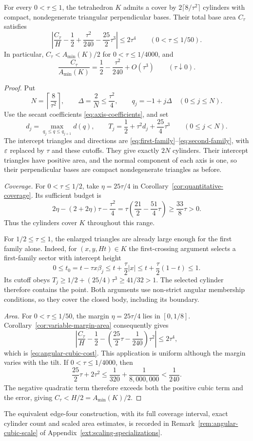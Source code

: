 \begin{proposition}\label{prop:angular-cubic}
For every $0<\tau\le1$, the tetrahedron $K$ admits a cover by
$2\lceil8/\tau^2\rceil$ cylinders with compact, nondegenerate triangular
perpendicular bases. Their total base area $C_\tau$ satisfies
\begin{equation}\label{eq:angular-cubic-cost}
 \left|\frac{C_\tau}{H}-\frac12+\frac{\tau^2}{240}
                   -\frac{25}{2}\tau^3\right|
 \le2\tau^4\qquad(0<\tau\le1/50).
\end{equation}
In particular, $C_\tau<A_{\min}(K)/2$ for $0<\tau\le1/4000$, and
\[
 \frac{C_\tau}{A_{\min}(K)}
 =\frac12-\frac{\tau^2}{240}+O(\tau^3)
 \qquad(\tau\downarrow0).
\]
\end{proposition}
\begin{proof}
Put
\[
 N=\left\lceil\frac8{\tau^2}\right\rceil,\qquad
 \Delta=\frac2N\le\frac{\tau^2}{4},\qquad
 q_j=-1+j\Delta\quad(0\le j\le N).
\]
Use the secant coefficients \eqref{eq:axis-coefficients}, and set
\begin{equation}\label{eq:cubic-caps}
 d_j=\max_{q_j\le q\le q_{j+1}}d(q),\qquad
 T_j=\frac12+\tau^2d_j+\frac{25}{4}\tau^3
 \qquad(0\le j<N).
\end{equation}
The intercept triangles and directions are
\eqref{eq:first-family}--\eqref{eq:second-family}, with $\varepsilon$ replaced
by $\tau$ and these cutoffs. They give exactly $2N$ cylinders.
Their intercept triangles have positive area, and the normal component
of each axis is one, so their perpendicular bases are compact
nondegenerate triangles as before.

\emph{Coverage.} For $0<\tau\le1/2$, take $\eta=25\tau/4$ in
Corollary~\ref{cor:quantitative-coverage}. Its sufficient budget is
\[
 2\eta-(2+2\eta)\tau-\frac{\tau^2}{4}
 =\tau\left(\frac{21}{2}-\frac{51}{4}\tau\right)
 \ge\frac{33}{8}\tau>0.
\]
Thus the cylinders cover $K$ throughout this range.

For $1/2\le\tau\le1$, the enlarged triangles are already large enough
for the first family alone. Indeed, for $(x,y,Ht)\in K$ the first-crossing
argument selects a first-family sector with intercept height
\[
 0\le t_0=t-\tau x\beta_j
 \le t+\frac{\tau}{2}|x|
 \le t+\frac{\tau}{2}(1-t)\le1.
\]
Its cutoff obeys
$T_j\ge1/2+(25/4)\tau^3\ge41/32>1$.
The selected cylinder therefore contains the point. Both arguments use
non-strict angular membership conditions, so they cover the closed
body, including its boundary.

\emph{Area.} For $0<\tau\le1/50$, the margin $\eta=25\tau/4$ lies
in $[0,1/8]$. Corollary~\ref{cor:variable-margin-area} consequently gives
\[
 \left|\frac{C_\tau}{H}-\frac12-
       \left(\frac{25}{2}\tau-\frac1{240}\right)\tau^2\right|
 \le2\tau^4,
\]
which is \eqref{eq:angular-cubic-cost}. This application is uniform
although the margin varies with the tilt. If $0<\tau\le1/4000$, then
\[
 \frac{25}{2}\tau+2\tau^2
 \le\frac1{320}+\frac1{8{,}000{,}000}<\frac1{240}.
\]
The negative quadratic term therefore exceeds both the positive cubic
term and the error, giving $C_\tau<H/2=A_{\min}(K)/2$.
\end{proof}

The equivalent edge-four construction, with its full coverage interval,
exact cylinder count and scaled area estimates, is recorded in
Remark~\ref{rem:angular-cubic-scale} of Appendix~\ref{ext:scaling-specializations}.
